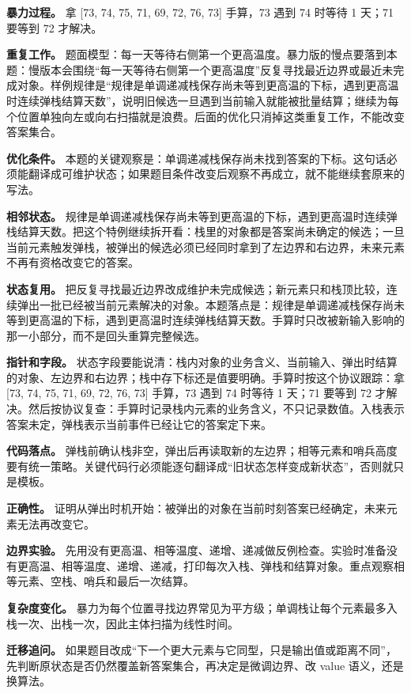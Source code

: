 \textbf{暴力过程。} 拿 [73, 74, 75, 71, 69, 72, 76, 73] 手算，73 遇到 74 时等待 1 天；71 要等到 72 才解决。

\textbf{重复工作。} 题面模型：每一天等待右侧第一个更高温度。暴力版的慢点要落到本题：慢版本会围绕“每一天等待右侧第一个更高温度”反复寻找最近边界或最近未完成对象。样例规律是“规律是单调递减栈保存尚未等到更高温的下标，遇到更高温时连续弹栈结算天数”，说明旧候选一旦遇到当前输入就能被批量结算；继续为每个位置单独向左或向右扫描就是浪费。后面的优化只消掉这类重复工作，不能改变答案集合。

\textbf{优化条件。} 本题的关键观察是：单调递减栈保存尚未找到答案的下标。这句话必须能翻译成可维护状态；如果题目条件改变后观察不再成立，就不能继续套原来的写法。

\textbf{相邻状态。} 规律是单调递减栈保存尚未等到更高温的下标，遇到更高温时连续弹栈结算天数。把这个特例继续拆开看：栈里的对象都是答案尚未确定的候选；一旦当前元素触发弹栈，被弹出的候选必须已经同时拿到了左边界和右边界，未来元素不再有资格改变它的答案。

\textbf{状态复用。} 把反复寻找最近边界改成维护未完成候选；新元素只和栈顶比较，连续弹出一批已经被当前元素解决的对象。本题落点是：规律是单调递减栈保存尚未等到更高温的下标，遇到更高温时连续弹栈结算天数。手算时只改被新输入影响的那一小部分，而不是回头重算完整候选。

\textbf{指针和字段。} 状态字段要能说清：栈内对象的业务含义、当前输入、弹出时结算的对象、左边界和右边界；栈中存下标还是值要明确。手算时按这个协议跟踪：拿 [73, 74, 75, 71, 69, 72, 76, 73] 手算，73 遇到 74 时等待 1 天；71 要等到 72 才解决。然后按协议复查：手算时记录栈内元素的业务含义，不只记录数值。入栈表示答案未定，弹栈表示当前事件已经让它的答案定下来。

\textbf{代码落点。} 弹栈前确认栈非空，弹出后再读取新的左边界；相等元素和哨兵高度要有统一策略。关键代码行必须能逐句翻译成“旧状态怎样变成新状态”，否则就只是模板。

\textbf{正确性。} 证明从弹出时机开始：被弹出的对象在当前时刻答案已经确定，未来元素无法再改变它。

\textbf{边界实验。} 先用没有更高温、相等温度、递增、递减做反例检查。实验时准备没有更高温、相等温度、递增、递减，打印每次入栈、弹栈和结算对象。重点观察相等元素、空栈、哨兵和最后一次结算。

\textbf{复杂度变化。} 暴力为每个位置寻找边界常见为平方级；单调栈让每个元素最多入栈一次、出栈一次，因此主体扫描为线性时间。

\textbf{迁移追问。} 如果题目改成“下一个更大元素与它同型，只是输出值或距离不同”，先判断原状态是否仍然覆盖新答案集合，再决定是微调边界、改 value 语义，还是换算法。

